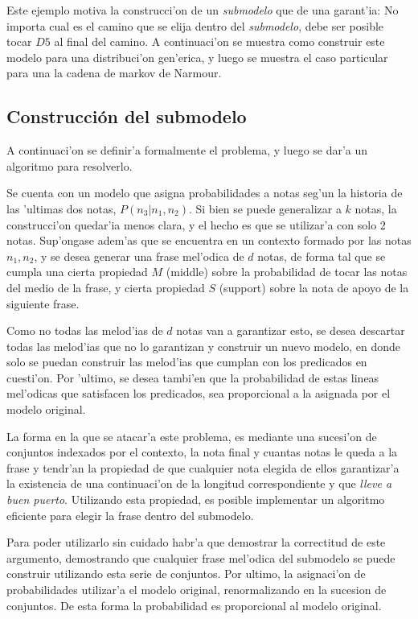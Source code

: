 Este ejemplo motiva la construcci'on de un \emph{submodelo} que de una garant'ia: No importa cual es el camino que se elija dentro
del \emph{submodelo}, debe ser posible tocar $D5$ al final del camino. A continuaci'on se muestra como construir este modelo 
para una distribuci'on gen'erica, y luego se muestra el caso particular para una la cadena de markov de Narmour.


\subsection{Construcci\'on del submodelo}
A continuaci'on se definir'a formalmente el problema, y luego se dar'a un algoritmo para resolverlo.

Se cuenta con un modelo que asigna probabilidades a notas seg'un la historia de las 'ultimas dos notas, $P(n_3 | n_1, n_2)$. Si bien se puede generalizar a $k$ notas,
la construcci'on quedar'ia menos clara, y el hecho es que se utilizar'a con solo 2 notas. Sup'ongase adem'as que se encuentra en un contexto formado por las notas 
$n_1, n_2$, y se desea generar una frase mel'odica de $d$ notas, de forma tal que se cumpla una cierta propiedad $M$ (middle) sobre la probabilidad de tocar las notas
del medio de la frase, y cierta propiedad $S$ (support) sobre la nota de apoyo de la siguiente frase.

Como no todas las melod'ias de $d$ notas van a garantizar esto, se desea descartar todas las melod'ias que no lo garantizan y construir un nuevo modelo, en donde
solo se puedan construir las melod'ias que cumplan con los predicados en cuesti'on. Por 'ultimo, se desea tambi'en que la probabilidad de estas lineas mel'odicas 
que satisfacen los predicados, sea proporcional a la asignada por el modelo original. 

La forma en la que se atacar'a este problema, es mediante una sucesi'on de conjuntos indexados por el contexto, la nota final y cuantas notas le queda
a la frase y tendr'an la propiedad de que cualquier nota elegida de ellos garantizar'a la existencia de una continuaci'on de la longitud correspondiente 
 y que \emph{lleve a buen puerto}. Utilizando esta propiedad, es posible implementar un algoritmo eficiente para elegir la frase dentro del submodelo. 

Para poder utilizarlo sin cuidado habr'a que demostrar la correctitud de este argumento, demostrando que cualquier frase mel'odica del submodelo se puede construir
utilizando esta serie de conjuntos. Por ultimo, la asignaci'on de probabilidades utilizar'a el modelo original, renormalizando en la sucesion de conjuntos. De esta 
forma la probabilidad es proporcional al modelo original.

